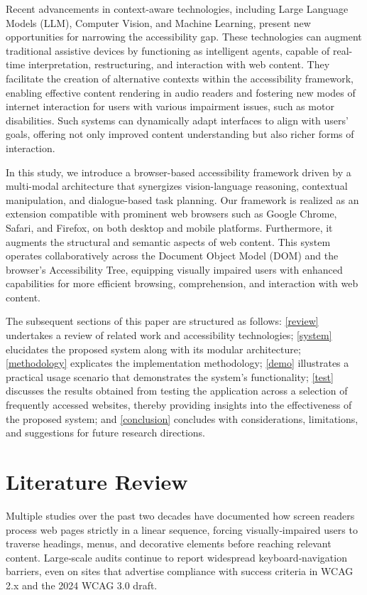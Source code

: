 \documentclass[conference]{IEEEtran}
\begin{document}
Recent advancements in context-aware technologies, including Large Language Models (LLM), Computer Vision, and Machine Learning, present new opportunities for narrowing the accessibility gap. These technologies can augment traditional assistive devices by functioning as intelligent agents, capable of real-time interpretation, restructuring, and interaction with web content. They facilitate the creation of alternative contexts within the accessibility framework, enabling effective content rendering in audio readers and fostering new modes of internet interaction for users with various impairment issues, such as motor disabilities. Such systems can dynamically adapt interfaces to align with users' goals, offering not only improved content understanding but also richer forms of interaction.

In this study, we introduce a browser-based accessibility framework driven by a multi-modal architecture that synergizes vision-language reasoning, contextual manipulation, and dialogue-based task planning. Our framework is realized as an extension compatible with prominent web browsers such as Google Chrome, Safari, and Firefox, on both desktop and mobile platforms. Furthermore, it augments the structural and semantic aspects of web content. This system operates collaboratively across the Document Object Model (DOM) and the browser's Accessibility Tree, equipping visually impaired users with enhanced capabilities for more efficient browsing, comprehension, and interaction with web content.

The subsequent sections of this paper are structured as follows: \autoref{review} undertakes a review of related work and accessibility technologies; \autoref{system} elucidates the proposed system along with its modular architecture; \autoref{methodology} explicates the implementation methodology; \autoref{demo} illustrates a practical usage scenario that demonstrates the system's functionality; \autoref{test} discusses the results obtained from testing the application across a selection of frequently accessed websites, thereby providing insights into the effectiveness of the proposed system; and \autoref{conclusion} concludes with considerations, limitations, and suggestions for future research directions.


\section{Literature Review}\label{review}

Multiple studies over the past two decades have documented how screen readers process web pages strictly in a linear sequence, forcing visually‑impaired users to traverse headings, menus, and decorative elements before reaching relevant content. \cite{Ramakrishnan2017-rn, wcagchallenges2025, martins2024large, abuaddous2016web} Large‑scale audits continue to report widespread keyboard‑navigation barriers, even on sites that advertise compliance with success criteria in WCAG 2.x and the 2024 WCAG 3.0 draft.\cite{wcagchallenges2025}
\end{document}
